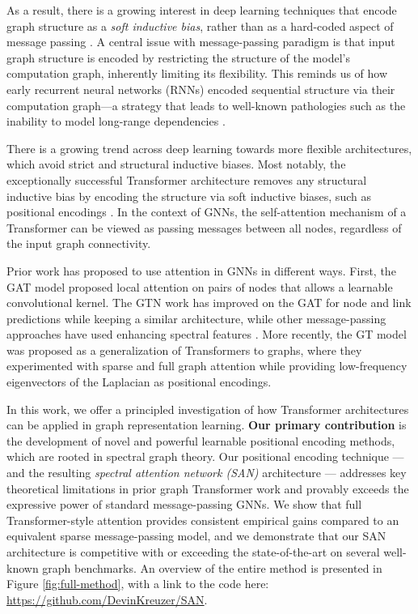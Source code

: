 \documentclass{article}
\begin{document}
As a result, there is a growing interest in deep learning techniques that encode graph structure as a {\em soft inductive bias}, rather than as a hard-coded aspect of message passing \cite{dwivedi2020generalization,kazi2020differentiable}.
A central issue with message-passing paradigm is that input graph structure is encoded by restricting the structure of the model's computation graph, inherently limiting its flexibility. 
This reminds us of how early recurrent neural networks (RNNs) encoded sequential structure via their computation graph---a strategy that leads to well-known pathologies such as the inability to model long-range dependencies \cite{hochreiter1997long}.

There is a growing trend across deep learning towards more flexible architectures, which avoid strict and structural inductive biases. 
Most notably, the exceptionally successful Transformer architecture removes any structural inductive bias by encoding the structure via soft inductive biases, such as positional encodings \cite{vaswani_2017_attention}. 
In the context of GNNs, the self-attention mechanism of a Transformer can be viewed as passing messages between all nodes, regardless of the input graph connectivity. 

Prior work has proposed to use attention in GNNs in different ways. First, the GAT model \cite{velikovic2017gat} proposed local attention on pairs of nodes that allows a learnable convolutional kernel. The GTN work \cite{yun_graph_2020} has improved on the GAT for node and link predictions while keeping a similar architecture, while other message-passing approaches have used enhancing spectral features \cite{changeSGAN, dongadaptive} . More recently, the GT model \cite{dwivedi2020generalization} was proposed as a generalization of Transformers to graphs, where they experimented with sparse and full graph attention while providing low-frequency eigenvectors of the Laplacian as positional encodings. 

In this work, we offer a principled investigation of how Transformer architectures can be applied in graph representation learning.
\textbf{Our primary contribution} is the development of novel and powerful learnable positional encoding methods, which are rooted in spectral graph theory. 
Our positional encoding technique --- and the resulting {\em spectral attention network (SAN)} architecture --- addresses key theoretical limitations in prior graph Transformer work \cite{dwivedi2020generalization} and provably exceeds the expressive power of standard message-passing GNNs. 
We show that full Transformer-style attention provides consistent empirical gains compared to an equivalent sparse message-passing model, and we demonstrate that our SAN architecture is competitive with or exceeding the state-of-the-art on several well-known graph benchmarks. An overview of the entire method is presented in Figure \ref{fig:full-method}, with a link to the code here: \url{https://github.com/DevinKreuzer/SAN}.
\end{document}
